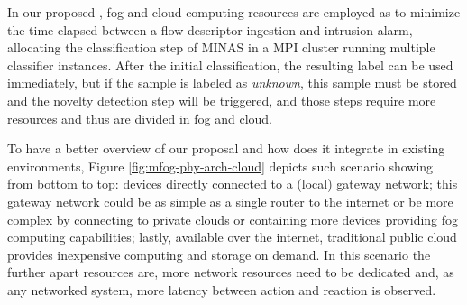 In our proposed \nids, fog and cloud computing resources are
employed as to minimize the time elapsed between a flow descriptor
ingestion and intrusion alarm, allocating the 
classification step of MINAS in a MPI cluster running multiple
classifier instances.
After the initial classification, the resulting label can be used immediately,
but if the sample is labeled as \emph{unknown}, this sample must be stored
and the novelty detection step will be triggered, and those steps require more resources
and thus are divided in fog and cloud.


To have a better overview of our proposal and how does it integrate in existing
\iot environments, Figure \ref{fig:mfog-phy-arch-cloud} depicts such scenario
showing from bottom to top:
\iot devices directly connected to a (local) gateway network;
this gateway network could be as simple as a single router to the internet
or be more complex by connecting to private clouds or 
containing more devices providing fog computing capabilities;
lastly, available over the internet, traditional public cloud provides
inexpensive computing and storage on demand.
In this scenario the further apart resources are, more network
resources need to be dedicated and, as any networked system, more
latency between action and reaction is observed.


